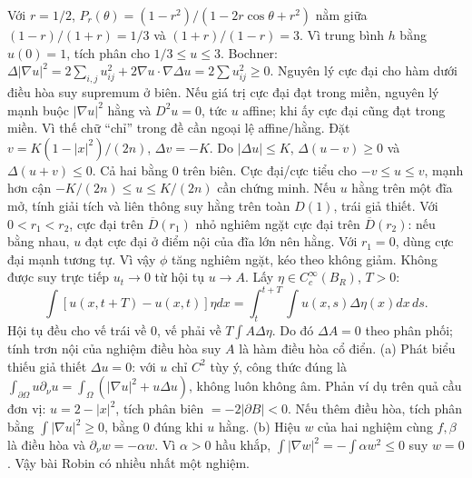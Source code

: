 Với $r=1/2$, $P_r(\theta)=(1-r^2)/(1-2r\cos\theta+r^2)$ nằm giữa $(1-r)/(1+r)=1/3$ và $(1+r)/(1-r)=3$. Vì trung bình $h$ bằng $u(0)=1$, tích phân cho $1/3\le u\le3$.
Bochner: $\Delta|\nabla u|^2=2\sum_{i,j}u_{ij}^2+2\nabla u\cdot\nabla\Delta u=2\sum u_{ij}^2\ge0$. Nguyên lý cực đại cho hàm dưới điều hòa suy supremum ở biên. Nếu giá trị cực đại đạt trong miền, nguyên lý mạnh buộc $|\nabla u|^2$ hằng và $D^2u=0$, tức $u$ affine; khi ấy cực đại cũng đạt trong miền. Vì thế chữ ``chỉ'' trong đề cần ngoại lệ affine/hằng.
Đặt $v=K(1-|x|^2)/(2n)$, $\Delta v=-K$. Do $|\Delta u|\le K$, $\Delta(u-v)\ge0$ và $\Delta(u+v)\le0$. Cả hai bằng 0 trên biên. Cực đại/cực tiểu cho $-v\le u\le v$, mạnh hơn cận $-K/(2n)\le u\le K/(2n)$ cần chứng minh.
Nếu $u$ hằng trên một đĩa mở, tính giải tích và liên thông suy hằng trên toàn $D(1)$, trái giả thiết. Với $0<r_1<r_2$, cực đại trên $\overline D(r_1)$ nhỏ nghiêm ngặt cực đại trên $\overline D(r_2)$: nếu bằng nhau, $u$ đạt cực đại ở điểm nội của đĩa lớn nên hằng. Với $r_1=0$, dùng cực đại mạnh tương tự. Vì vậy $\phi$ tăng nghiêm ngặt, kéo theo không giảm.
Không được suy trực tiếp $u_t\to0$ từ hội tụ $u\to A$. Lấy $\eta\in C_c^\infty(B_R)$, $T>0$:
\[\int[u(x,t+T)-u(x,t)]\eta dx=\int_t^{t+T}\int u(x,s)\Delta\eta(x)dx\,ds.\]
Hội tụ đều cho vế trái về 0, vế phải về $T\int A\Delta\eta$. Do đó $\Delta A=0$ theo phân phối; tính trơn nội của nghiệm điều hòa suy $A$ là hàm điều hòa cổ điển.
(a) Phát biểu thiếu giả thiết $\Delta u=0$: với $u$ chỉ $C^2$ tùy ý, công thức đúng là $\int_{\partial\Omega}u\partial_\nu u=\int_\Omega(|\nabla u|^2+u\Delta u)$, không luôn không âm. Phản ví dụ trên quả cầu đơn vị: $u=2-|x|^2$, tích phân biên $=-2|\partial B|<0$. Nếu thêm điều hòa, tích phân bằng $\int|\nabla u|^2\ge0$, bằng 0 đúng khi $u$ hằng.
(b) Hiệu $w$ của hai nghiệm cùng $f,\beta$ là điều hòa và $\partial_\nu w=-\alpha w$. Vì $\alpha>0$ hầu khắp, $\int|\nabla w|^2=-\int\alpha w^2\le0$ suy $w=0$. Vậy bài Robin có nhiều nhất một nghiệm.
